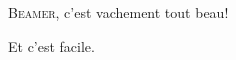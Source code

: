 \documentclass{beamer}
\title{}
\author{Olivier FINOT}\institute{Collège Jules Ferry, Beaune}
\begin{document}
\begin{frame}
  \titlepage
\end{frame}

\begin{frame}
	\textsc{Beamer}, c'est vachement tout beau!
\end{frame}

\begin{frame}
Et c'est facile.
\end{frame}
\end{document}
